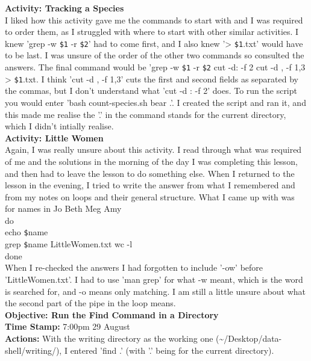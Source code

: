 \documentclass{article}
\begin{document}
\begin{FlushLeft}
\vspace{5mm}
\textbf{Activity: Tracking a Species} \\
I liked how this activity gave me the commands to start with and I was required to order them, as I struggled with where to start with other similar activities. I knew 'grep -w \verb|$1| -r \verb|$2|' had to come first, and I also knew '\textgreater{} \verb|$1|.txt' would have to be last. I was unsure of the order of the other two commands so consulted the answers. The final command would be 'grep -w \verb|$1| -r \verb|$2| \textbar{} cut -d: -f 2 \textbar{} cut -d , -f 1,3 \textgreater{} \verb|$1|.txt. I think  'cut -d , -f 1,3' cuts the first and second fields as separated by the commas, but I don't understand what 'cut -d : -f 2' does. To run the script you would enter 'bash count-species.sh bear .'. I created the script and ran it, and this made me realise the '.' in the command stands for the current directory, which I didn't intially realise.\\
\vspace{5mm}
\textbf{Activity: Little Women} \\
Again, I was really unsure about this activity. I read through what was required of me and the solutions in the morning of the day I was completing this lesson, and then had to leave the lesson to do something else. When I returned to the lesson in the evening, I tried to write the answer from what I remembered and from my notes on loops and their general structure. What I came up with was \\
for names in Jo Beth Meg Amy\\
do\\
echo \verb|$|name\\
grep \verb|$|name LittleWomen.txt \textbar{} wc -l\\
done\\
When I re-checked the answers I had forgotten to include '-ow' before 'LittleWomen.txt'. I had to use 'man grep' for what -w meant, which is the word is searched for, and -o means only matching. I am still a little unsure about what the second part of the pipe in the loop means.\\
\vspace{5mm}
\textbf{Objective: Run the Find Command in a Directory}\\ 
\textbf{Time Stamp:} 7:00pm 29 August\\
\textbf{Actions:} With the writing directory as the working one (\~{}/Desktop/data-shell/writing/), I entered 'find .' (with '.' being for the current directory). \\

\end{FlushLeft}
\end{document}
